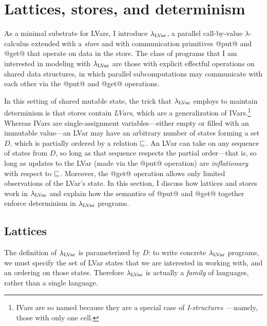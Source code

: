 \section{Lattices, stores, and determinism}\label{s:lvars-lattices}

As a minimal substrate for LVars, I introduce $\lambda_{\textrm{LVar}}$, a
parallel call-by-value $\lambda$-calculus extended with a \emph{store}
and with communication primitives @put@ and @get@ that operate on data
in the store.  The class of programs that I am interested in modeling
with $\lambda_{\textrm{LVar}}$ are those with explicit effectful operations on
shared data structures, in which parallel subcomputations may
communicate with each other via the @put@ and @get@ operations.

In this setting of shared mutable state, the trick that $\lambda_{\textrm{LVar}}$
employs to maintain determinism is that stores contain \emph{LVars},
which are a generalization of IVars.\footnote{IVars are so named
  because they are a special case of
  \emph{I-structures}~\cite{IStructures}---namely, those with only one
  cell.}  Whereas IVars are single-assignment variables---either empty
or filled with an immutable value---an LVar may have an arbitrary
number of states forming a set $D$, which is partially ordered by a
relation $\sqsubseteq$.  An LVar can take on any sequence of states from
$D$, so long as that sequence respects the partial order---that is, so
long as updates to the LVar (made via the @put@ operation) are
\emph{inflationary} with respect to $\sqsubseteq$.  Moreover, the @get@
operation allows only limited observations of the LVar's state.  In
this section, I discuss how lattices and stores work in $\lambda_{\textrm{LVar}}$
and explain how the semantics of @put@ and @get@ together enforce
determinism in $\lambda_{\textrm{LVar}}$ programs.

\subsection{Lattices}\label{subsection:lvars-lattices}

The definition of $\lambda_{\textrm{LVar}}$ is parameterized by $D$: to write
concrete $\lambda_{\textrm{LVar}}$ programs, we must specify the set of LVar
states that we are interested in working with, and an ordering on
those states.  Therefore $\lambda_{\textrm{LVar}}$ is actually a \emph{family} of
languages, rather than a single language.

